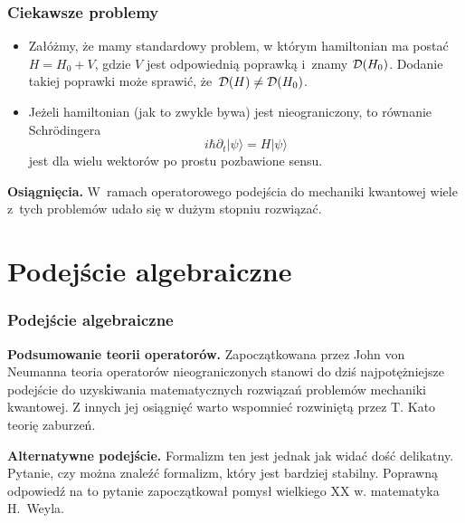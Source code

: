 \documentclass[10pt,t]{beamer}
\begin{document}
\begin{frame}
  \frametitle{Ciekawsze problemy}


  \begin{itemize}
    \RaggedRight

  \item Załóżmy, że mamy standardowy problem, w którym hamiltonian ma postać
    $H = H_{ 0 } + V$, gdzie $V$ jest odpowiednią poprawką i~znamy
    $\mathcal{D}( H_{ 0 } )$. Dodanie takiej poprawki może sprawić,
    że~$\mathcal{D}( H ) \neq \mathcal{D}( H_{ 0 } )$.

  \item Jeżeli hamiltonian (jak to zwykle bywa) jest nieograniczony, to
    równanie Schr\"{o}dingera
    \begin{equation}
      \label{eq:Matematyczna-strona-05}
      i \hbar \partial_{ t } | \psi \rangle = H | \psi \rangle
    \end{equation}
    jest dla wielu wektorów po prostu pozbawione sensu.

  \end{itemize}



  \textbf{Osiągnięcia.} W~ramach operatorowego podejścia do mechaniki
  kwantowej wiele z~tych problemów udało się w dużym stopniu rozwiązać.

\end{frame}










\section{Podejście algebraiczne}



\begin{frame}
  \frametitle{Podejście algebraiczne}


  \textbf{Podsumowanie teorii operatorów.}
  Zapoczątkowana przez John von Neumanna teoria operatorów nieograniczonych
  stanowi do dziś najpotężniejsze podejście do uzyskiwania matematycznych
  rozwiązań problemów mechaniki kwantowej. Z innych jej osiągnięć warto
  wspomnieć rozwiniętą przez T. Kato teorię zaburzeń.

  \textbf{Alternatywne podejście.}
  Formalizm ten jest jednak jak widać dość delikatny. Pytanie, czy można
  znaleźć formalizm, który jest bardziej stabilny. Poprawną odpowiedź
  na to pytanie zapoczątkował pomysł wielkiego XX w. matematyka H.~Weyla.

\end{frame}
\end{document}
